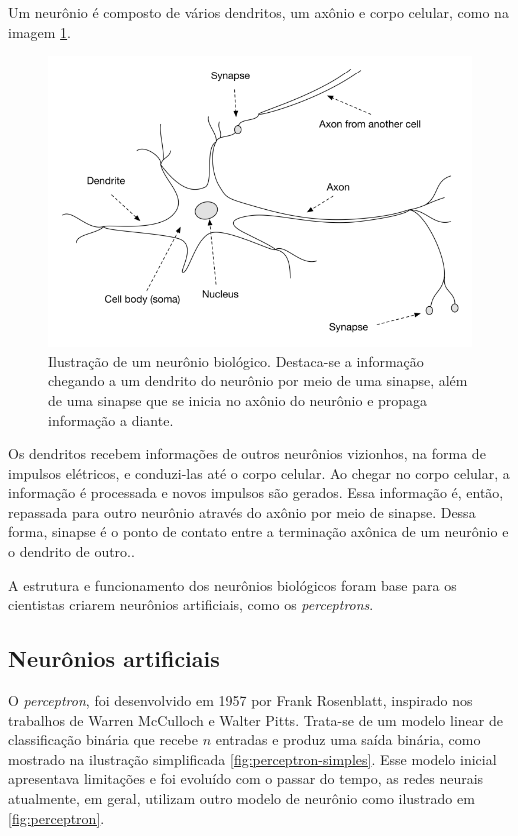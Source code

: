Um neurônio é composto de vários dendritos, um axônio e corpo 
celular, como na imagem \ref{fig:neuron}. 

\begin{figure}[H] 
  \includegraphics[width= 12cm]{../figuras/neuron.png}
  \caption{Ilustração de um neurônio biológico. \cite{dl-oreilly}
  Destaca-se a informação chegando a um dendrito do neurônio
  por meio de uma sinapse, além de uma sinapse que se inicia no axônio 
  do neurônio e propaga informação a diante.
  }
  \label{fig:neuron}
\end{figure}

Os dendritos recebem 
informações de outros neurônios vizionhos, na forma de impulsos
elétricos, e conduzi-las até o corpo celular. Ao chegar no corpo
celular, a informação é processada e novos impulsos são gerados. 
Essa informação é, então, repassada para outro neurônio 
através do axônio por meio de sinapse. Dessa forma, sinapse é o
ponto de contato entre a terminação axônica de um neurônio e o 
dendrito de outro.\cite{deeplearningbook}. 

A estrutura e funcionamento dos neurônios biológicos foram 
base para os cientistas criarem neurônios artificiais, como 
os \textit{perceptrons}.

\subsection{Neurônios artificiais}

O \textit{perceptron}, foi desenvolvido em 1957 por Frank 
Rosenblatt, inspirado nos trabalhos de Warren McCulloch e Walter Pitts.
Trata-se de um modelo linear de classificação binária que 
recebe $n$ entradas e produz uma saída binária, como mostrado 
na ilustração simplificada \ref{fig:perceptron-simples}.\cite{deeplearningbook}
Esse modelo inicial apresentava limitações e foi evoluído com o passar do 
tempo, as redes neurais atualmente, em geral, utilizam 
outro modelo de neurônio como ilustrado em \ref{fig:perceptron}.


